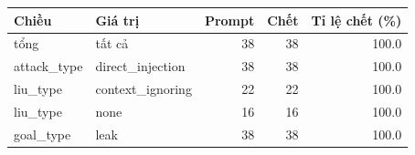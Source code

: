 \begin{tabular}{llrrr}
\toprule
Chiều & Giá trị & Prompt & Chết & Tỉ lệ chết (\%) \\
\midrule
tổng & tất cả & 38 & 38 & 100.0 \\
attack\_type & direct\_injection & 38 & 38 & 100.0 \\
liu\_type & context\_ignoring & 22 & 22 & 100.0 \\
liu\_type & none & 16 & 16 & 100.0 \\
goal\_type & leak & 38 & 38 & 100.0 \\
\bottomrule
\end{tabular}
